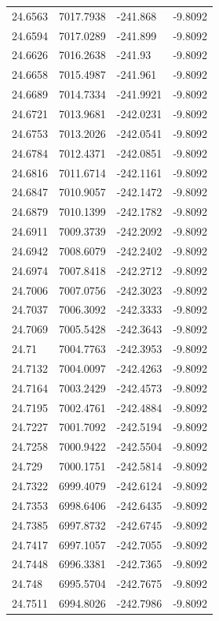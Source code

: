 \begin{table}[H]
\begin{tabular}{llll}
24.6563 & 7017.7938 & -241.868 & -9.8092 \\
24.6594 & 7017.0289 & -241.899 & -9.8092 \\
24.6626 & 7016.2638 & -241.93 & -9.8092 \\
24.6658 & 7015.4987 & -241.961 & -9.8092 \\
24.6689 & 7014.7334 & -241.9921 & -9.8092 \\
24.6721 & 7013.9681 & -242.0231 & -9.8092 \\
24.6753 & 7013.2026 & -242.0541 & -9.8092 \\
24.6784 & 7012.4371 & -242.0851 & -9.8092 \\
24.6816 & 7011.6714 & -242.1161 & -9.8092 \\
24.6847 & 7010.9057 & -242.1472 & -9.8092 \\
24.6879 & 7010.1399 & -242.1782 & -9.8092 \\
24.6911 & 7009.3739 & -242.2092 & -9.8092 \\
24.6942 & 7008.6079 & -242.2402 & -9.8092 \\
24.6974 & 7007.8418 & -242.2712 & -9.8092 \\
24.7006 & 7007.0756 & -242.3023 & -9.8092 \\
24.7037 & 7006.3092 & -242.3333 & -9.8092 \\
24.7069 & 7005.5428 & -242.3643 & -9.8092 \\
24.71 & 7004.7763 & -242.3953 & -9.8092 \\
24.7132 & 7004.0097 & -242.4263 & -9.8092 \\
24.7164 & 7003.2429 & -242.4573 & -9.8092 \\
24.7195 & 7002.4761 & -242.4884 & -9.8092 \\
24.7227 & 7001.7092 & -242.5194 & -9.8092 \\
24.7258 & 7000.9422 & -242.5504 & -9.8092 \\
24.729 & 7000.1751 & -242.5814 & -9.8092 \\
24.7322 & 6999.4079 & -242.6124 & -9.8092 \\
24.7353 & 6998.6406 & -242.6435 & -9.8092 \\
24.7385 & 6997.8732 & -242.6745 & -9.8092 \\
24.7417 & 6997.1057 & -242.7055 & -9.8092 \\
24.7448 & 6996.3381 & -242.7365 & -9.8092 \\
24.748 & 6995.5704 & -242.7675 & -9.8092 \\
24.7511 & 6994.8026 & -242.7986 & -9.8092 \\

\end{tabular}
\end{table}
